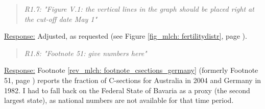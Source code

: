 \bigskip\bigskip
{}
\begin{quote}
	\textit{R1.7: "Figure V.1: the vertical lines in the graph should be placed right at the cut-off date May 1"}
\end{quote}
\underline{Response:} Adjusted, as requested (see Figure \ref{fig_mlch: fertilitydistr}, page \pageref{fig_mlch: fertilitydistr}).

\bigskip\bigskip
{}
\begin{quote}
	\textit{R1.8: "Footnote 51: give numbers here"}
\end{quote}
\underline{Response:} Footnote \ref{rev_mlch: footnote_csections_germany} (formerly Footnote 51, page \pageref{rev_mlch: footnote_csections_germany}) reports the fraction of C-sections for Australia in 2004 and Germany in 1982. I had to fall back on the Federal State of Bavaria as a proxy (the second largest state), as national numbers are not available for that time period.











